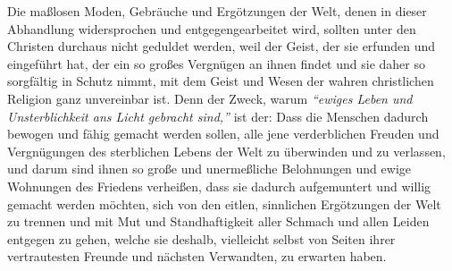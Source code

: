 Die maßlosen
Moden, Gebräuche und Ergötzungen der Welt, denen in dieser
Abhandlung widersprochen und entgegengearbeitet wird, sollten unter den Christen
durchaus nicht geduldet werden, weil der Geist, der sie erfunden und eingeführt
hat, der ein so großes Vergnügen an ihnen findet und sie daher so sorgfältig in
Schutz nimmt, mit dem Geist und Wesen der wahren christlichen Religion ganz
unvereinbar ist. Denn der Zweck, warum
\textit{"`ewiges Leben und Unsterblichkeit ans
Licht gebracht sind,"'} ist der: Dass die Menschen dadurch bewogen und fähig
gemacht werden sollen, alle jene verderblichen Freuden und Vergnügungen des
sterblichen Lebens der Welt zu überwinden
und zu verlassen, und darum sind ihnen
so große und unermeßliche Belohnungen und ewige
Wohnungen des Friedens
verheißen, dass sie dadurch aufgemuntert und willig gemacht werden möchten, sich
von den eitlen, sinnlichen Ergötzungen der Welt zu trennen und mit Mut und
Standhaftigkeit aller Schmach und allen Leiden
entgegen zu gehen, welche sie
deshalb, vielleicht selbst von Seiten ihrer vertrautesten Freunde und nächsten
Verwandten, zu erwarten haben.


\medskip


